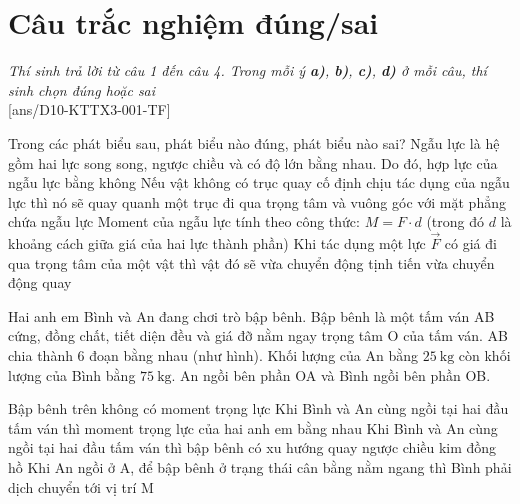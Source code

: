 \section{Câu trắc nghiệm đúng/sai} 
\textit{Thí sinh trả lời từ câu 1 đến câu 4. Trong mỗi ý \textbf{a)}, \textbf{b)}, \textbf{c)}, \textbf{d)} ở mỗi câu, thí sinh chọn đúng hoặc sai}
\setcounter{ex}{0}\\
[ans/D10-KTTX3-001-TF]
\begin{ex} Trong các phát biểu sau, phát biểu nào đúng, phát biểu nào sai?
	\choiceTF
	{Ngẫu lực là hệ gồm hai lực song song, ngược chiều và có độ lớn bằng nhau. Do đó, hợp lực của ngẫu lực bằng không}
	{\True Nếu vật không có trục quay cố định chịu tác dụng của ngẫu lực thì nó sẽ quay quanh một trục đi qua trọng tâm và vuông góc với mặt phẳng chứa ngẫu lực}
	{\True Moment của ngẫu lực tính theo công thức: $M=F\cdot d$ (trong đó $d$ là khoảng cách giữa giá của hai lực thành phần)}
	{Khi tác dụng một lực $\vec{F}$ có giá đi qua trọng tâm của một vật thì vật đó sẽ vừa chuyển động tịnh tiến vừa chuyển động quay}
	\loigiai{}
\end{ex}
\begin{ex}
	Hai anh em Bình và An đang chơi trò bập bênh. Bập bênh là một tấm ván AB cứng, đồng chất, tiết diện đều và giá đỡ nằm ngay trọng tâm O của tấm ván. AB chia thành 6 đoạn bằng nhau (như hình). Khối lượng của An bằng $\SI{25}{\kilogram}$ còn khối lượng của Bình bằng $\SI{75}{\kilogram}$. An ngồi bên phần OA và Bình ngồi bên phần OB.
	\begin{center}
	\end{center}
	\choiceTF
	{\True Bập bênh trên không có moment trọng lực}
	{Khi Bình và An cùng ngồi tại hai đầu tấm ván thì moment trọng lực của hai anh em bằng nhau }
	{Khi Bình và An cùng ngồi tại hai đầu tấm ván thì bập bênh có xu hướng quay ngược chiều kim đồng hồ}
	{\True Khi An ngồi ở A, để bập bênh ở trạng thái cân bằng nằm ngang thì Bình phải dịch chuyển tới vị trí M}
\end{ex}
